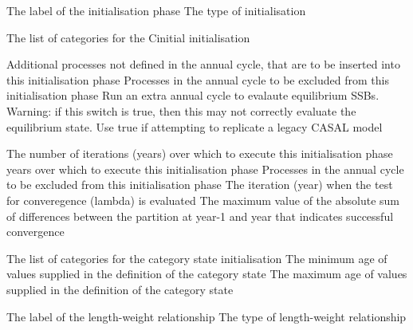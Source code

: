 \par\par
{} {The label of the initialisation phase}
 {The type of initialisation}
\par\textbf{}\par
{} {The list of categories for the Cinitial initialisation}
\par\textbf{}\par
{} {Additional processes not defined in the annual cycle, that are to be inserted into this initialisation phase}
 {Processes in the annual cycle to be excluded from this initialisation phase}
 {Run an extra annual cycle to evalaute equilibrium SSBs. Warning: if this switch is true, then this may not correctly evaluate the equilibrium state. Use true if attempting to replicate a legacy CASAL model}
\par\textbf{}\par
{} {The number of iterations (years) over which to execute this initialisation phase}
 {years over which to execute this initialisation phase}
 {Processes in the annual cycle to be excluded from this initialisation phase}
 {The iteration (year) when the test for converegence (lambda) is evaluated}
 {The maximum value of the absolute sum of differences between the partition at year-1 and year that indicates successful convergence}
\par\textbf{}\par
{} {The list of categories for the category state initialisation}
 {The minimum age of values supplied in the definition of the category state}
 {The maximum age of values supplied in the definition of the category state}

\par\par
{} {The label of the length-weight relationship}
 {The type of length-weight relationship}

